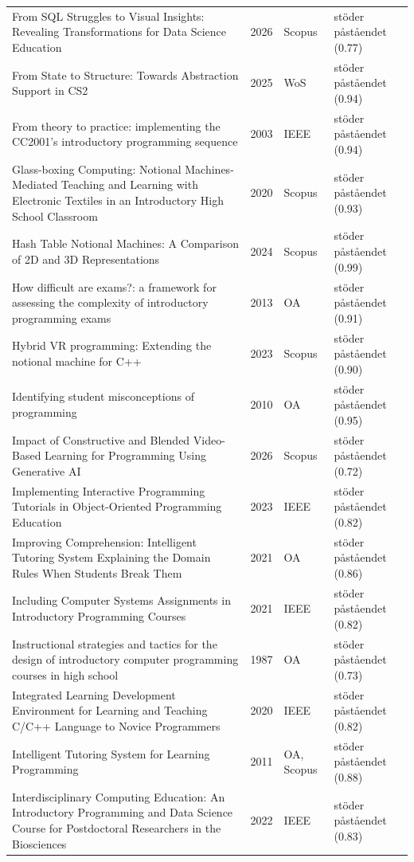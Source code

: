 \begin{longtable}{@{}%
  >{\raggedright\arraybackslash}p{}c%
  >{\raggedright\arraybackslash}p{}%
  >{\raggedright\arraybackslash}p{}@{}}
From SQL Struggles to Visual Insights: Revealing Transformations for Data Science Education & 2026 & Scopus & stöder påståendet (0.77) \\
From State to Structure: Towards Abstraction Support in CS2 & 2025 & WoS & stöder påståendet (0.94) \\
From theory to practice: implementing the CC2001's introductory programming sequence & 2003 & IEEE & stöder påståendet (0.94) \\
Glass-boxing Computing: Notional Machines-Mediated Teaching and Learning with Electronic Textiles in an Introductory High School Classroom & 2020 & Scopus & stöder påståendet (0.93) \\
Hash Table Notional Machines: A Comparison of 2D and 3D Representations & 2024 & Scopus & stöder påståendet (0.99) \\
How difficult are exams?: a framework for assessing the complexity of introductory programming exams & 2013 & OA & stöder påståendet (0.91) \\
Hybrid VR programming: Extending the notional machine for C++ & 2023 & Scopus & stöder påståendet (0.90) \\
Identifying student misconceptions of programming & 2010 & OA & stöder påståendet (0.95) \\
Impact of Constructive and Blended Video-Based Learning for Programming Using Generative AI & 2026 & Scopus & stöder påståendet (0.72) \\
Implementing Interactive Programming Tutorials in Object-Oriented Programming Education & 2023 & IEEE & stöder påståendet (0.82) \\
Improving Comprehension: Intelligent Tutoring System Explaining the Domain Rules When Students Break Them & 2021 & OA & stöder påståendet (0.86) \\
Including Computer Systems Assignments in Introductory Programming Courses & 2021 & IEEE & stöder påståendet (0.82) \\
Instructional strategies and tactics for the design of introductory computer programming courses in high school & 1987 & OA & stöder påståendet (0.73) \\
Integrated Learning Development Environment for Learning and Teaching C/C++ Language to Novice Programmers & 2020 & IEEE & stöder påståendet (0.82) \\
Intelligent Tutoring System for Learning Programming & 2011 & OA, Scopus & stöder påståendet (0.88) \\
Interdisciplinary Computing Education: An Introductory Programming and Data Science Course for Postdoctoral Researchers in the Biosciences & 2022 & IEEE & stöder påståendet (0.83) \\

\end{longtable}
